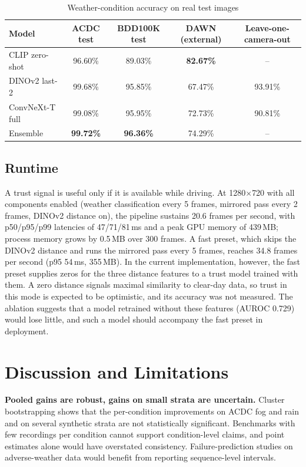 \documentclass[pdflatex,sn-mathphys-num]{sn-jnl}
\begin{document}
\begin{table}[t]
\caption{Weather-condition accuracy on real test images}
\label{tab:weather}
\begin{tabular}{@{}lcccc@{}}
\toprule
Model & ACDC test & BDD100K test & DAWN (external) & Leave-one-camera-out \\
\midrule
CLIP zero-shot & 96.60\% & 89.03\% & \textbf{82.67\%} & -- \\
DINOv2 last-2 & 99.68\% & 95.85\% & 67.47\% & 93.91\% \\
ConvNeXt-T full & 99.08\% & 95.95\% & 72.73\% & 90.81\% \\
Ensemble & \textbf{99.72\%} & \textbf{96.36\%} & 74.29\% & -- \\
\bottomrule
\end{tabular}
\end{table}

\subsection{Runtime}

A trust signal is useful only if it is available while driving. At 1280$\times$720 with all components enabled (weather classification every 5 frames, mirrored pass every 2 frames, DINOv2 distance on), the pipeline sustains 20.6 frames per second, with p50/p95/p99 latencies of 47/71/81\,ms and a peak GPU memory of 439\,MB; process memory grows by 0.5\,MB over 300 frames. A fast preset, which skips the DINOv2 distance and runs the mirrored pass every 5 frames, reaches 34.8 frames per second (p95 54\,ms, 355\,MB). In the current implementation, however, the fast preset supplies zeros for the three distance features to a trust model trained with them. A zero distance signals maximal similarity to clear-day data, so trust in this mode is expected to be optimistic, and its accuracy was not measured. The ablation suggests that a model retrained without these features (AUROC 0.729) would lose little, and such a model should accompany the fast preset in deployment.

\section{Discussion and Limitations}\label{sec:discussion}

\textbf{Pooled gains are robust, gains on small strata are uncertain.} Cluster bootstrapping shows that the per-condition improvements on ACDC fog and rain and on several synthetic strata are not statistically significant. Benchmarks with few recordings per condition cannot support condition-level claims, and point estimates alone would have overstated consistency. Failure-prediction studies on adverse-weather data would benefit from reporting sequence-level intervals.
\end{document}
